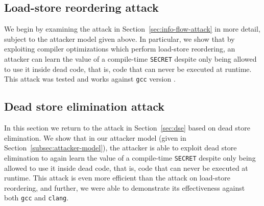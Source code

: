 \subsection{Load-store reordering attack}
\label{subsec:exp-rel-mem}

We begin by examining the attack in Section~\ref{sec:info-flow-attack} in
more detail, subject to the attacker model given above.
In particular, we show that by exploiting compiler optimizations which perform
load-store reordering, an attacker can learn the value of a compile-time
\verb|SECRET| despite only being allowed to use it inside dead code, that is,
code that can never be executed at runtime.
This attack was tested and works against \verb|gcc| version .


\subsection{Dead store elimination attack}
\label{subsec:exp-dse}

In this section we return to the attack in Section~\ref{sec:dse} based on
dead store elimination.
We show that in our attacker model (given in
Section~\ref{subsec:attacker-model}), the attacker is able to exploit dead
store elimination to again learn the value of a compile-time \verb|SECRET|
despite only being allowed to use it inside dead code, that is, code that can
never be executed at runtime.
This attack is even more efficient than the attack on load-store reordering,
and further, we were able to demonstrate its effectiveness against both
\verb|gcc| and \verb|clang|.


